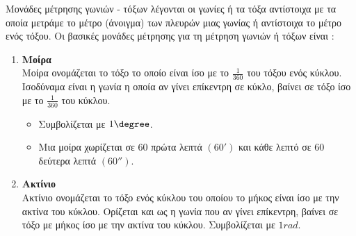 Μονάδες μέτρησης γωνιών - τόξων λέγονται οι γωνίες ή τα τόξα αντίστοιχα με τα οποία μετράμε το μέτρο (άνοιγμα) των πλευρών μιας γωνίας ή αντίστοιχα το μέτρο ενός τόξου.
Οι βασικές μονάδες μέτρησης για τη μέτρηση γωνιών ή τόξων είναι :
\begin{enumerate}[itemsep=0mm,label=\bf\arabic*.]
\item \textbf{Μοίρα}\\
Μοίρα ονομάζεται το τόξο το οποίο είναι ίσο με το $ \frac{1}{360} $ του τόξου ενός κύκλου.
Ισοδύναμα είναι η γωνία η οποία αν γίνει επίκεντρη σε κύκλο, βαίνει σε τόξο ίσο με το $ \frac{1}{360} $ του κύκλου.
\begin{itemize}[itemsep=0mm]
\item Συμβολίζεται με $ 1\degree $.
\item Μια μοίρα χωρίζεται σε 60 πρώτα λεπτά $ (60') $ και κάθε λεπτό σε 60 δεύτερα λεπτά $ (60'') $.
\end{itemize}
\item \textbf{Ακτίνιο}\\
Ακτίνιο ονομάζεται το τόξο ενός κύκλου του οποίου το μήκος είναι ίσο με την ακτίνα του κύκλου. Ορίζεται και ως η γωνία που αν γίνει επίκεντρη, βαίνει σε τόξο με μήκος ίσο με την ακτίνα του κύκλου.
Συμβολίζεται με $ 1rad $.
\end{enumerate}

